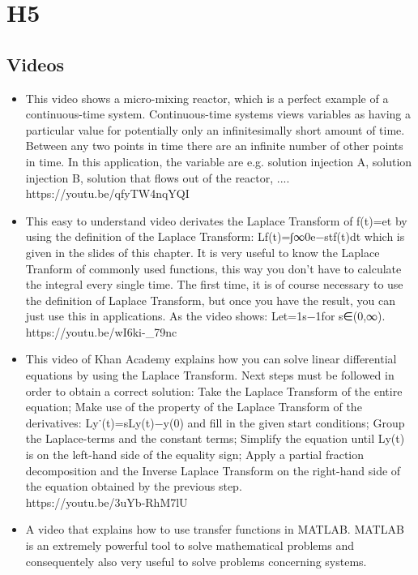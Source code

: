 \documentclass{document}
\begin{document}
	\section{H5}
		\subsection{Videos}
		\begin{itemize}
			\item 	This video shows a micro-mixing reactor, which is a perfect example of a continuous-time system. Continuous-time systems views variables as having a particular value for potentially only an infinitesimally short amount of time. Between any two points in time there are an infinite number of other points in time. In this application, the variable are e.g. solution injection A, solution injection B, solution that flows out of the reactor, ....\\
			https://youtu.be/qfyTW4nqYQI
			\item This easy to understand video derivates the Laplace Transform of  f(t)=et by using the definition of the Laplace Transform: L{f(t)}=∫∞0e−stf(t)dt which is given in the slides of this chapter. It is very useful to know the Laplace Tranform of commonly used functions, this way you don't have to calculate the integral every single time. The first time, it is of course necessary to use the definition of Laplace Transform, but once you have the result, you can just use this in applications. As the video shows: L{et}=1s−1for s∈(0,∞).\\
			https://youtu.be/wI6ki-_79nc
			\item This video of Khan Academy explains how you can solve linear differential equations by using the Laplace Transform. Next steps must be followed in order to obtain a correct solution:
			Take the Laplace Transform of the entire equation;
			Make use of the property of the Laplace Transform of the derivatives: L{y˙(t)}=sL{y(t)}−y(0) and fill in the given start conditions;
			Group the Laplace-terms and the constant terms;
			Simplify the equation until L{y(t)} is on the left-hand side of the equality sign;
			Apply a partial fraction decomposition and the Inverse Laplace Transform on the right-hand side of the equation obtained by the previous step.\\
			https://youtu.be/3uYb-RhM7lU
			\item A video that explains how to use transfer functions in MATLAB. MATLAB is an extremely powerful tool to solve mathematical problems and consequentely also very useful to solve problems concerning systems.\\

\end{itemize}
\end{document}
